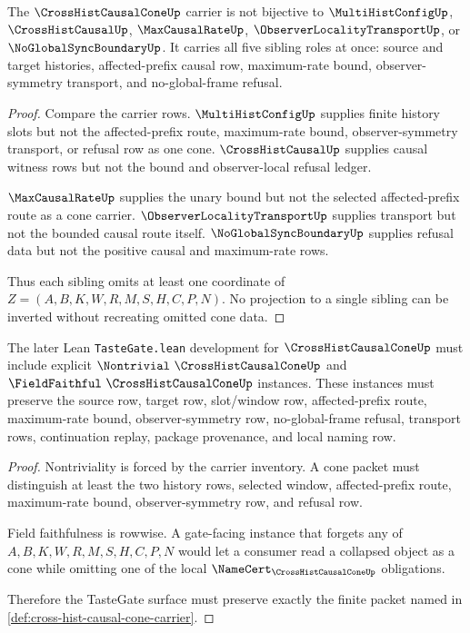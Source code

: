 \begin{theorem}
\label{thm:cross-hist-causal-cone-sibling-independence}
The $\CrossHistCausalConeUp$ carrier is not bijective to $\MultiHistConfigUp$, $\CrossHistCausalUp$, $\MaxCausalRateUp$, $\ObserverLocalityTransportUp$, or $\NoGlobalSyncBoundaryUp$. It carries all five sibling roles at once: source and target histories, affected-prefix causal row, maximum-rate bound, observer-symmetry transport, and no-global-frame refusal.
\end{theorem}
\begin{proof}
Compare the carrier rows. $\MultiHistConfigUp$ supplies finite history slots but not the affected-prefix route, maximum-rate bound, observer-symmetry transport, or refusal row as one cone. $\CrossHistCausalUp$ supplies causal witness rows but not the bound and observer-local refusal ledger.

$\MaxCausalRateUp$ supplies the unary bound but not the selected affected-prefix route as a cone carrier. $\ObserverLocalityTransportUp$ supplies transport but not the bounded causal route itself. $\NoGlobalSyncBoundaryUp$ supplies refusal data but not the positive causal and maximum-rate rows.

Thus each sibling omits at least one coordinate of $Z=(A,B,K,W,R,M,S,H,C,P,N)$. No projection to a single sibling can be inverted without recreating omitted cone data.
\end{proof}

\begin{theorem}
\label{thm:cross-hist-causal-cone-tastegate-surface}
The later Lean \texttt{TasteGate.lean} development for $\CrossHistCausalConeUp$ must include explicit $\Nontrivial\ \CrossHistCausalConeUp$ and $\FieldFaithful\ \CrossHistCausalConeUp$ instances. These instances must preserve the source row, target row, slot/window row, affected-prefix route, maximum-rate bound, observer-symmetry row, no-global-frame refusal, transport rows, continuation replay, package provenance, and local naming row.
\end{theorem}
\begin{proof}
Nontriviality is forced by the carrier inventory. A cone packet must distinguish at least the two history rows, selected window, affected-prefix route, maximum-rate bound, observer-symmetry row, and refusal row.

Field faithfulness is rowwise. A gate-facing instance that forgets any of $A,B,K,W,R,M,S,H,C,P,N$ would let a consumer read a collapsed object as a cone while omitting one of the local $\NameCert_{\CrossHistCausalConeUp}$ obligations.

Therefore the TasteGate surface must preserve exactly the finite packet named in \autoref{def:cross-hist-causal-cone-carrier}.
\end{proof}

